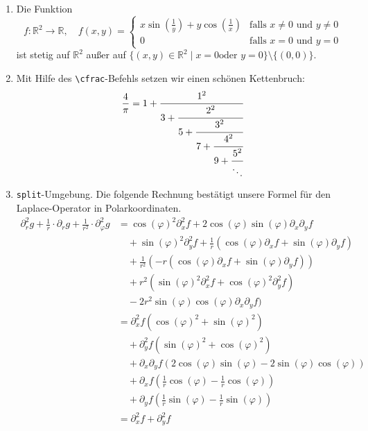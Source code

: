\documentclass{article}
\newcommand{\p}{\partial}
\begin{document}
\begin{enumerate}
\item Die Funktion
  \[f\colon \mathbb{R}^{2} \to \mathbb{R}, \quad f(x, y) =
    \begin{cases}
      x \sin\left(\frac1y\right) + y\cos\left(\frac1x\right)
      & \text{falls \(x \ne 0\) und \(y \ne 0\)} \\
      0 & \text{falls \(x = 0\) und \(y = 0\)}
    \end{cases}
  \]
  ist stetig auf \(\mathbb{R}^{2}\) außer auf \(\{(x, y) \in \mathbb{R}^{2} \mid x = 0 \text{
    oder } y = 0 \} \setminus \{(0, 0)\}\).
\item Mit Hilfe des \texttt{\textbackslash{}cfrac}-Befehls setzen wir einen schönen
  Kettenbruch:
  \begin{align*}
    \frac4\pi = 1 + \cfrac{1^{2}}{3+
    \cfrac{2^{2}}{5+
    \cfrac{3^{2}}{7+
    \cfrac{4^{2}}{
    9 + \cfrac{5^{2}}{\ddots}
    }}}}
  \end{align*}
\item \texttt{split}-Umgebung.  Die folgende Rechnung bestätigt unsere
  Formel für den Laplace-Operator in Polarkoordinaten.
  \begin{align*}
          \p^{2}_{r}g + \frac1r \cdot \p_{r}g + \frac{1}{r^{2}} \cdot \p^{2}_{\varphi}g
      &= \cos(\varphi)^{2} \p_{x}^{2}f + 2 \cos(\varphi)\sin(\varphi)\p_{x}\p_{y} f \\
      &\quad + \sin(\varphi)^{2}\p_{y}^{2}f + \frac1r(\cos(\varphi)\p_{x}f +
        \sin(\varphi)\p_{y}f) \\
      &\quad + \frac{1}{r^{2}}(-r(\cos(\varphi)\partial_{x}f + \sin(\varphi)\p_{y}f)) \\
      &\quad + r^{2}(\sin(\varphi)^{2}\p_{x}^{2}f + \cos(\varphi)^{2}\p_{y}^{2}f) \\
      &\quad - 2r^{2}\sin(\varphi)\cos(\varphi)\p_{x}\p_{y}f) \\
      &= \p_{x}^{2}f(\cos(\varphi)^{2} + \sin(\varphi)^{2}) \tag{1}\\
      &\quad + \p_{y}^{2}f(\sin(\varphi)^{2} + \cos(\varphi)^{2}) \\
      &\quad + \p_{x}\p_{y}f(2 \cos(\varphi)\sin(\varphi) - 2 \sin(\varphi)\cos(\varphi)) \\
      &\quad + \p_{x}f(\frac1r \cos(\varphi) - \frac1r \cos(\varphi)) \\
      &\quad + \p_{y}f(\frac1r \sin(\varphi) - \frac1r \sin(\varphi)) \\
      &= \p_{x}^{2}f + \p_{y}^{2} f
  \end{align*}

\end{enumerate}
\end{document}
